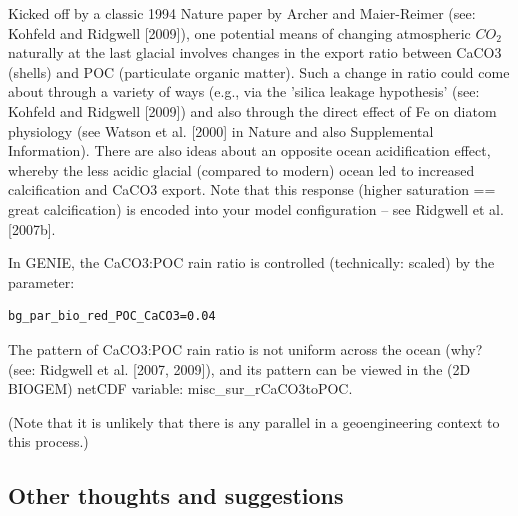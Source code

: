 \documentclass[11pt,fleqn]{book} %
\begin{document}
Kicked off by a classic 1994 Nature paper by Archer and Maier-Reimer (see: Kohfeld and Ridgwell [2009]), one potential means of changing atmospheric \(CO_{2}\) naturally at the last glacial involves changes in the export ratio between CaCO3 (shells) and POC (particulate organic matter). Such a change in ratio could come about through a variety of ways (e.g., via the 'silica leakage hypothesis' (see: Kohfeld and Ridgwell [2009]) and also through the direct effect of Fe on diatom physiology (see Watson et al. [2000] in Nature and also Supplemental Information). There are also ideas about an opposite ocean acidification effect, whereby the less acidic glacial (compared to modern) ocean led to increased calcification and CaCO3 export. Note that this response (higher saturation == great calcification) is encoded into your model configuration – see Ridgwell et al. [2007b].

In GENIE, the CaCO3:POC rain ratio is controlled (technically: scaled) by the parameter:
\small\begin{verbatim}
bg_par_bio_red_POC_CaCO3=0.04
\end{verbatim}\normalsize

The pattern of CaCO3:POC rain ratio is not uniform across the ocean (why? (see: Ridgwell et al. [2007, 2009]), and its pattern can be viewed in the (2D BIOGEM) netCDF variable: \textsf{\footnotesize misc\_sur\_rCaCO3toPOC}.

(Note that it is unlikely that there is any parallel in a geoengineering context to this process.)


\subsection{Other thoughts and suggestions}
\end{document}
